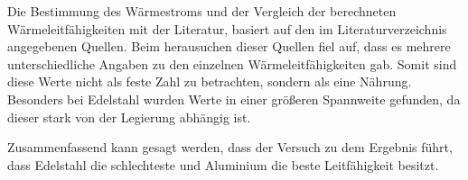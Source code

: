 Die Bestimmung des Wärmestroms und der Vergleich der berechneten Wärmeleitfähigkeiten mit der Literatur,
basiert auf den im Literaturverzeichnis angegebenen Quellen.
Beim herausuchen dieser Quellen fiel auf,
dass es mehrere unterschiedliche Angaben zu den einzelnen Wärmeleitfähigkeiten gab.
Somit sind diese Werte nicht als feste Zahl zu betrachten, sondern als eine Nährung.
Besonders bei Edelstahl wurden Werte in einer größeren Spannweite gefunden,
da dieser stark von der Legierung abhängig ist.

Zusammenfassend kann gesagt werden, dass der Versuch zu dem Ergebnis führt,
dass Edelstahl die schlechteste und Aluminium die beste Leitfähigkeit besitzt.
